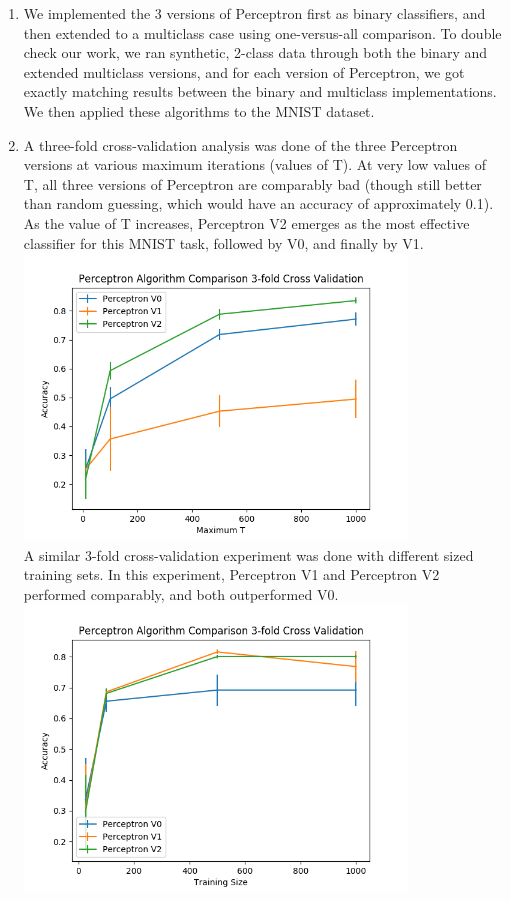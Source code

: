 \documentclass[twoside,11pt]{homework}
\DeclarePairedDelimiter{\2norm}{\lVert}{\rVert^2_2}
\newcommand{\1}[1]{\mathds{1}\left[#1\right]}
\begin{document}
\begin{enumerate}[\bf (i)]

\item We implemented the 3 versions of Perceptron first as binary classifiers, and then extended to a multiclass case using one-versus-all comparison. To double check our work, we ran synthetic, 2-class data through both the binary and extended multiclass versions, and for each version of Perceptron, we got exactly matching results between the binary and multiclass implementations. We then applied these algorithms to the MNIST dataset.

\item A three-fold cross-validation analysis was done of the three Perceptron versions at various maximum iterations (values of T). At very low values of T, all three versions of Perceptron are comparably bad (though still better than random guessing, which would have an accuracy of approximately 0.1). As the value of T increases, Perceptron V2 emerges as the most effective classifier for this MNIST task, followed by V0, and finally by V1. \\
\includegraphics[width=0.8\textwidth]{perceptron_compare.png}\\
A similar 3-fold cross-validation experiment was done with different sized training sets. In this experiment, Perceptron V1 and Perceptron V2 performed comparably, and both outperformed V0.\\
\includegraphics[width=0.8\textwidth]{perceptron_compare_size.png}


\end{enumerate}
\end{document}
